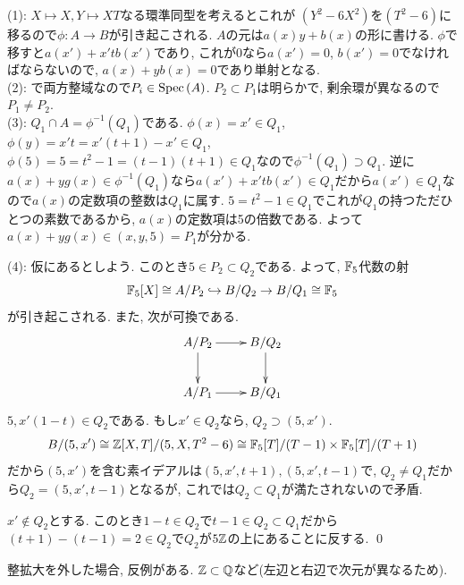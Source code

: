 \begin{egans}
(1): $X\mapsto X, Y\mapsto XT$なる環準同型を考えるとこれが $(Y^2-6X^2)$を$(T^2 - 6)$に移るので$\phi:A\to B$が引き起こされる. $A$の元は$a(x)y + b(x)$の形に書ける. $\phi$で移すと$a(x') + x'tb(x')$であり, これが0なら$a(x') = 0$, $b(x')=0$でなければならないので, $a(x) + yb(x) = 0$であり単射となる. \\
(2):
で両方整域なので$P_i\in \mathrm{Spec}\left( A \right)$. $P_2\subset P_1$は明らかで, 剰余環が異なるので$P_1\neq P_2$. \\
(3): $Q_1\cap A = \phi^{-1}(Q_1)$である.  $\phi(x) = x' \in Q_1$, $\phi(y) = x't = x'(t+1) - x' \in Q_1$, $\phi(5) = 5 = t^2 - 1 = (t-1)(t+1)\in Q_1$なので$\phi^{-1}(Q_1) \supset Q_1$. 逆に$a(x)+yg(x) \in \phi^{-1}(Q_1)$なら$a(x') + x'tb(x') \in Q_1$だから$a(x') \in Q_1$なので$a(x)$の定数項の整数は$Q_1$に属す. $5 = t^2-1 \in Q_1$でこれが$Q_1$の持つただひとつの素数であるから, $a(x)$の定数項は5の倍数である. よって$a(x) + yg(x)\in (x,y,5) = P_1$が分かる. \par
(4): 仮にあるとしよう. このとき$5\in P_2 \subset Q_2$である. よって, $\mathbb{F}_{5}$代数の射
\[\mathbb{F}_{5}[X]\cong A/P_2 \hookrightarrow B/Q_2\to B/Q_1\cong \mathbb{F}_{5}\]
が引き起こされる. また, 次が可換である.
\[
\xymatrix{
A/P_2 \ar[d]\ar[r] & B/Q_2 \ar[d] \\
A/P_1\ar[r] &B/Q_1
}
\]
$5, x'(1-t) \in Q_2$である. もし$x'\in Q_2$なら, $Q_2\supset (5,x')$.
\[B/(5,x') \cong \mathbb{Z}[X,T]/(5,X,T^2-6) \cong \mathbb{F}_{5}[T]/(T-1)\times \mathbb{F}_{5}[T]/(T+1) \]
だから$(5,x')$を含む素イデアルは$(5,x',t+1), (5,x',t-1)$で, $Q_2\neq Q_1$だから$Q_2 = (5,x',t-1)$となるが, これでは$Q_2\subset Q_1$が満たされないので矛盾. \par
$x'\notin Q_2$とする. このとき$1-t\in Q_2$で$t-1 \in Q_2 \subset Q_1$だから$(t+1) - (t-1) = 2\in Q_2$で$Q_2$が$5\mathbb{Z}$の上にあることに反する. \qed
\end{egans}

\begin{rem}
整拡大を外した場合, 反例がある. $\mathbb{Z}\subset \mathbb{Q}$など(左辺と右辺で次元が異なるため).
\end{rem}

\begin{egprob}

\end{egprob}








